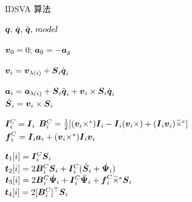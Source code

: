 \documentclass[letterpaper, 10 pt, conference]{ieeetran}  %
\begin{document}
\begin{algorithm}[t]
\small
\caption{IDSVA 算法}

\begin{algorithmic}[1]  %
\REQUIRE $ \q, \,\qd ,\, \qdd,\, model$

\STATE $ \v_0 = 0; \, \a_{{0}} = -\a_g  $



\STATE  $ \v_{i} =  \v_{\lambda(i)} +  \red{\Phibar_i} \qd_{i}$


\STATE $\a_{i} =  \a_{\lambda(i)} +  \Phibar_i \ddot{\q}_{i} + \v_i \times \Phibar_{i} \qd_i$ \\

\STATE $ \red{\Phibardot_i}  =  \v_{i} \times \red{\Phibar_i}  $\\[.5ex] 


\STATE $\I_i^C = \I_i$
\STATE $ \B_i^C = \frac{1}{2}[ ( \v_{i} \times^*) \I_i -  \I_i  ( \v_{i} \times ) + (\I_i \v_i )\crff ]  $\\[.5ex]

\STATE $ \f_i^C =  \I_i  \a_{i} + ( \v_{i} \times^*) \I_i \v_{i}  $\\[.5ex]  %


\ENDFOR



\STATE $ \t_1[i] = \I{}_{i}^C  \red{{\Phibar}_i} $\\[.5ex] %

\STATE $\t_2[i] = 2\B{}_i^C \red{\Phibar_i} + \I_i^C ( \red{\Phibardot_i + \Psibardot_i } )$\\[.5ex] %

 \STATE $\t_3[i] = 2 \B{}_i^C  \red{\Psibardot_i} + \I{}_{i}^C \red{\Psibarddot_i}  + \red{\f_i^C \crff {\Phibar}_i}  $\\[.5ex]
\STATE $\t_4[i] =   2[\B_i^C]\T \red{{\Phibar}_i}$\\[.5ex] %


\end{algorithmic}
\end{algorithm}
\end{document}
